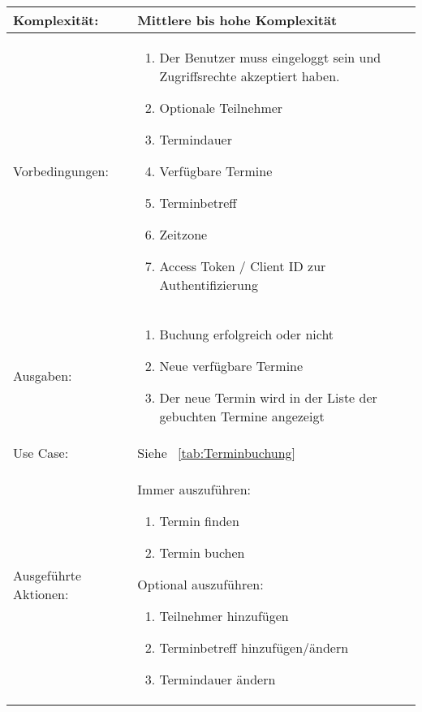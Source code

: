 \begin{tabularx}{\textwidth}{|X|X|}
    \hline
    Komplexität: & Mittlere bis hohe Komplexität\\
    \hline
    Vorbedingungen: & \begin{enumerate}
                          \item Der Benutzer muss eingeloggt sein und Zugriffsrechte akzeptiert haben.
                          \item Optionale Teilnehmer
                          \item Termindauer
                          \item Verfügbare Termine
                          \item Terminbetreff
                          \item Zeitzone
                          \item Access Token / Client ID zur Authentifizierung
    \end{enumerate}\\
    \hline
    Ausgaben: & \begin{enumerate}
                    \item Buchung erfolgreich oder nicht
                    \item Neue verfügbare Termine
                    \item Der neue Termin wird in der Liste der gebuchten Termine angezeigt
    \end{enumerate}\\
    \hline
    Use Case: & Siehe ~\ref{tab:Terminbuchung}\\
    \hline
    Ausgeführte Aktionen: & Immer auszuführen: \begin{enumerate}
                                                     \item Termin finden
                                                   \item Termin buchen
                                            \end{enumerate}
            \linebreak Optional auszuführen: \begin{enumerate}
                                      \item Teilnehmer hinzufügen
                                      \item Terminbetreff hinzufügen/ändern
                                        \item Termindauer ändern
                                      \end{enumerate}\\
    \hline
\end{tabularx}
\normalsize
\pagebreak